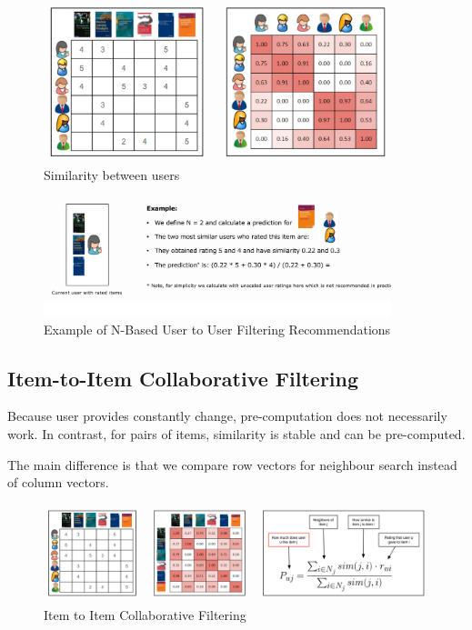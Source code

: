 \documentclass[11pt]{article}
\begin{document}
\begin{figure}[htb!]
    \centering
    \includegraphics[keepaspectratio=true, width=0.9\textwidth]{user_to_user_collaborative_filtering_v2.png}
    \caption{Similarity between users}
    \label{fig:user_similarity}
\end{figure}

\newpage

\begin{figure}[htb!]
    \centering
    \includegraphics[keepaspectratio=true, width=0.9\textwidth]{user_to_user_collaborative_filtering_v3.png}
    \caption{Example of N-Based User to User Filtering Recommendations}
    \label{fig:user_to_user_recommendation}
\end{figure}


\subsection{Item-to-Item Collaborative Filtering}

Because user provides constantly change, pre-computation does not necessarily work. In contrast, for pairs of items, similarity is stable and can be pre-computed.

The main difference is that we compare row vectors for neighbour search instead of column vectors.

\begin{figure}[htb!]
    \centering
    \includegraphics[keepaspectratio=true, width=\linewidth]{item_to_item_collaborative_filtering.png}
    \caption{Item to Item Collaborative Filtering}
    \label{fig:item_to_item_collaborative_filtering}
\end{figure}
\end{document}
